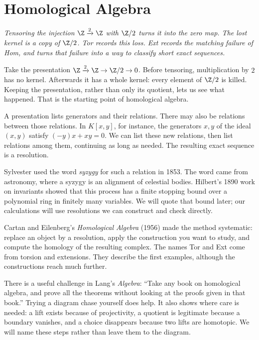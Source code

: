 \chapter{Homological Algebra}

\begin{center}\itshape
Tensoring the injection $\Z\xrightarrow{2}\Z$ with $\Z/2$ turns it into the zero map. The lost kernel is a copy of $\Z/2$. Tor records this loss. Ext records the matching failure of Hom, and turns that failure into a way to classify short exact sequences.
\end{center}

Take the presentation $\Z\xrightarrow{2}\Z\to\Z/2\to0$. Before tensoring, multiplication by $2$ has no kernel. Afterwards it has a whole kernel: every element of $\Z/2$ is killed. Keeping the presentation, rather than only its quotient, lets us see what happened. That is the starting point of homological algebra.

A presentation lists generators and their relations. There may also be relations between those relations. In $K[x,y]$, for instance, the generators $x,y$ of the ideal $(x,y)$ satisfy $(-y)x+xy=0$. We can list these new relations, then list relations among them, continuing as long as needed. The resulting exact sequence is a resolution.

Sylvester used the word \emph{syzygy} for such a relation in 1853. The word came from astronomy, where a syzygy is an alignment of celestial bodies. Hilbert's 1890 work on invariants showed that this process has a finite stopping bound over a polynomial ring in finitely many variables. We will quote that bound later; our calculations will use resolutions we can construct and check directly.

Cartan and Eilenberg's \emph{Homological Algebra} (1956) made the method systematic: replace an object by a resolution, apply the construction you want to study, and compute the homology of the resulting complex. The names Tor and Ext come from torsion and extensions. They describe the first examples, although the constructions reach much further.

There is a useful challenge in Lang's \emph{Algebra}: ``Take any book on homological algebra, and prove all the theorems without looking at the proofs given in that book.'' Trying a diagram chase yourself does help. It also shows where care is needed: a lift exists because of projectivity, a quotient is legitimate because a boundary vanishes, and a choice disappears because two lifts are homotopic. We will name these steps rather than leave them to the diagram.

